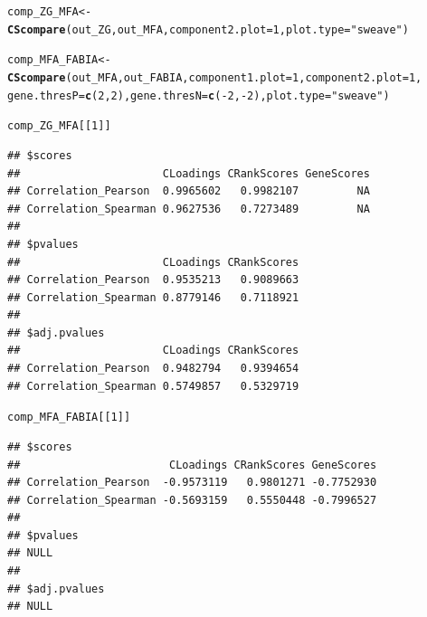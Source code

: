 \documentclass[a4paper]{article}\usepackage[]{graphicx}\usepackage[]{color}
\makeatletter
\newcommand{\hlnum}[1]{\textcolor[rgb]{0.686,0.059,0.569}{#1}}%
\newcommand{\hlstr}[1]{\textcolor[rgb]{0.192,0.494,0.8}{#1}}%
\newcommand{\hlopt}[1]{\textcolor[rgb]{0,0,0}{#1}}%
\newcommand{\hlstd}[1]{\textcolor[rgb]{0.345,0.345,0.345}{#1}}%
\newcommand{\hlkwb}[1]{\textcolor[rgb]{0.69,0.353,0.396}{#1}}%
\newcommand{\hlkwc}[1]{\textcolor[rgb]{0.333,0.667,0.333}{#1}}%
\newcommand{\hlkwd}[1]{\textcolor[rgb]{0.737,0.353,0.396}{\textbf{#1}}}%
\newenvironment{kframe}{%
 \def\at@end@of@kframe{}%
 \ifinner\ifhmode%
  \def\at@end@of@kframe{\end{minipage}}%
  \begin{minipage}{\columnwidth}%
 \fi\fi%
 \def\FrameCommand##1{\hskip\@totalleftmargin \hskip-\fboxsep
 \colorbox{shadecolor}{##1}\hskip-\fboxsep
     \hskip-\linewidth \hskip-\@totalleftmargin \hskip\columnwidth}%
 \MakeFramed {\advance\hsize-\width
   \@totalleftmargin\z@ \linewidth\hsize
   \@setminipage}}%
 {\par\unskip\endMakeFramed%
 \at@end@of@kframe}
\newenvironment{knitrout}{}{} %
\makeatother
\begin{document}
\begin{knitrout}
\color{fgcolor}\begin{kframe}
\begin{alltt}
        \hlstd{comp_ZG_MFA} \hlkwb{<-} \hlkwd{CScompare}\hlstd{(out_ZG,out_MFA,}\hlkwc{component2.plot}\hlstd{=}\hlnum{1}\hlstd{,}\hlkwc{plot.type}\hlstd{=}\hlstr{"sweave"}\hlstd{)}

        \hlstd{comp_MFA_FABIA} \hlkwb{<-} \hlkwd{CScompare}\hlstd{(out_MFA,out_FABIA,}\hlkwc{component1.plot}\hlstd{=}\hlnum{1}\hlstd{,}\hlkwc{component2.plot}\hlstd{=}\hlnum{1}\hlstd{,}
                        \hlkwc{gene.thresP}\hlstd{=}\hlkwd{c}\hlstd{(}\hlnum{2}\hlstd{,}\hlnum{2}\hlstd{),}\hlkwc{gene.thresN}\hlstd{=}\hlkwd{c}\hlstd{(}\hlopt{-}\hlnum{2}\hlstd{,}\hlopt{-}\hlnum{2}\hlstd{),}\hlkwc{plot.type}\hlstd{=}\hlstr{"sweave"}\hlstd{)}

        \hlstd{comp_ZG_MFA[[}\hlnum{1}\hlstd{]]}
\end{alltt}
\begin{verbatim}
## $scores
##                      CLoadings CRankScores GeneScores
## Correlation_Pearson  0.9965602   0.9982107         NA
## Correlation_Spearman 0.9627536   0.7273489         NA
## 
## $pvalues
##                      CLoadings CRankScores
## Correlation_Pearson  0.9535213   0.9089663
## Correlation_Spearman 0.8779146   0.7118921
## 
## $adj.pvalues
##                      CLoadings CRankScores
## Correlation_Pearson  0.9482794   0.9394654
## Correlation_Spearman 0.5749857   0.5329719
\end{verbatim}
\begin{alltt}
        \hlstd{comp_MFA_FABIA[[}\hlnum{1}\hlstd{]]}
\end{alltt}
\begin{verbatim}
## $scores
##                       CLoadings CRankScores GeneScores
## Correlation_Pearson  -0.9573119   0.9801271 -0.7752930
## Correlation_Spearman -0.5693159   0.5550448 -0.7996527
## 
## $pvalues
## NULL
## 
## $adj.pvalues
## NULL
\end{verbatim}
\end{kframe}\begin{figure}[H]



\end{figure}
\end{knitrout}
\end{document}
